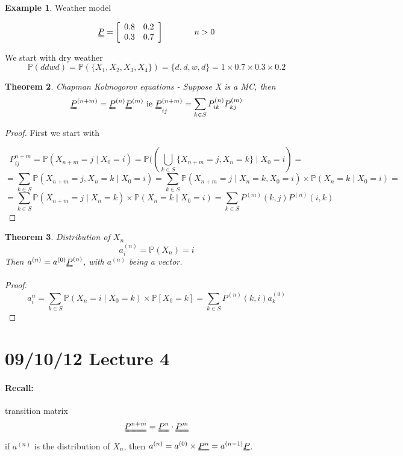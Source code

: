 \documentclass{article}
\newtheorem{thm}{Theorem}
\theoremstyle{definition}
\newtheorem{ex}[thm]{Example}
\begin{document}
\begin{ex} Weather model

\[
\uuline{P} = \left [ \begin{array}{cc} 0.8 & 0.2 \\ 0.3 & 0.7 \end{array} \right ] \hspace*{0.5 in} n > 0
\]

We start with dry weather 
\[
\mathbb{P}(ddwd) = \mathbb{P}(\{X_1, X_2, X_3,X_4\} ) = \{d,d,w,d\} = 1 \times 0.7 \times 0.3 \times 0.2
\] 
\end{ex}

\begin{thm} Chapman Kolmogorov equations -
Suppose X is a MC, then
\[
\uuline{P}^{(n + m)} = \uuline{P}^{(n)} \uuline{P}^{(m)} \mbox{ ie } \uuline{P}_{ij}^{(n+m)} = \sum_{k \in S} P_{ik}^{(n)} P_{kj}^{(m)}
\]
\end{thm}

\begin{proof} First we start with

\[
P_{ij}^{n+m} = \mathbb{P}(X_{n+m} = j \mid X_0 = i )= \mathbb{P}((\bigcup_{k \in S} \{ X_{n+m} = j, X_n = k \} \mid X_0 = i) =
\]
\[ = \sum_{k \in S} \mathbb{P}(X_{n+m} = j, X_n = k \mid X_0 = i) = \sum_{k \in S} \mathbb{P}(X_{n+m} = j \mid X_n = k, X_0 = i ) \times \mathbb{P} (X_n = k \mid X_0 = i) = 
\]
\[ = \sum_{k \in S} \mathbb{P} (X_{n+m} = j \mid X_n = k) \times \mathbb{P}(X_n = k \mid X_0 = i) = \sum_{k \in S} P^{(m)}(k,j) P^{(n)}(i,k)
\]
\end{proof}

\begin{thm} Distribution of $X_n$
\[
a_i^{(n)} = \mathbb{P}(X_n) = i
\]
Then $a^{(n)} = a^{(0)} \uuline{P}^{(n)}$, with $a^{(n)}$ being a vector.
\end{thm}

\begin{proof}
\[
a_i^n = \sum_{k \in S} \mathbb{P} (X_n = i \mid X_0 = k ) \times \mathbb{P}[X_0 = k] = \sum_{k \in S} P^{(n)} (k,i) a_k^{(0)}
\] 
\end{proof}

\section{09/10/12 Lecture 4}

\paragraph*{Recall:} transition matrix
\[
\uuline{P^{n+m}} = \uuline{P^{n}} \cdot \uuline{P^{m}} 
\]
if $a^{(n)}$ is the distribution of $X_n$, then $a^{(n)} = a^{(0)} \times \uuline{P^{n}} = a^{(n-1)}\uuline{P}$.
\end{document}
